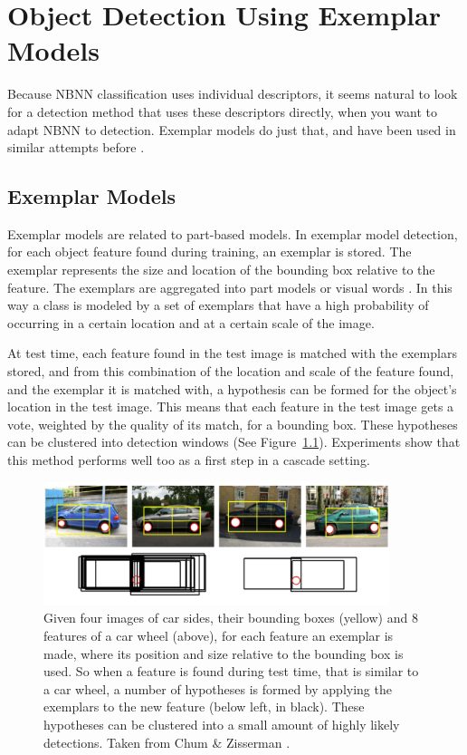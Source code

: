 \chapter{Object Detection Using Exemplar Models} %
\label{cha:object_detection}

Because NBNN classification uses individual descriptors, it seems natural to look for a detection method that uses these descriptors directly, when you want to adapt NBNN to detection. Exemplar models do just that, and have been used in similar attempts before \cite{becker2012codebook}.

\section{Exemplar Models} %
\label{sub:exemplar_models}

Exemplar models \cite{leibe2004combined, chum2007exemplar} are related to part-based models. In exemplar model detection, for each object feature found during training, an exemplar is stored. The exemplar represents the size and location of the bounding box relative to the feature. The exemplars are aggregated into part models \cite{leibe2004combined} or visual words \cite{chum2007exemplar}. In this way a class is modeled by a set of exemplars that have a high probability of occurring in a certain location and at a certain scale of the image.

At test time, each feature found in the test image is matched with the exemplars stored, and from this combination of the location and scale of the feature found, and the exemplar it is matched with, a hypothesis can be formed for the object's location in the test image. This means that each feature in the test image gets a vote, weighted by the quality of its match, for a bounding box. These hypotheses can be clustered into detection windows (See Figure~\ref{fig:exemplar_model}). Experiments show that this method performs well too as a first step in a cascade setting. \cite{vedaldi2009multiple}

\begin{figure}[hbt]
    \centering
    \includegraphics[width=0.9\textwidth]{ExemplarModel}
    \caption{Given four images of car sides, their bounding boxes (yellow) and 8 features of a car wheel (above), for each feature an exemplar is made, where its position and size relative to the bounding box is used. So when a feature is found during test time, that is similar to a car wheel, a number of hypotheses is formed by applying the exemplars to the new feature (below left, in black). These hypotheses can be clustered into a small amount of highly likely detections. Taken from Chum \& Zisserman \cite{chum2007exemplar}.}
    \label{fig:exemplar_model}
\end{figure}

